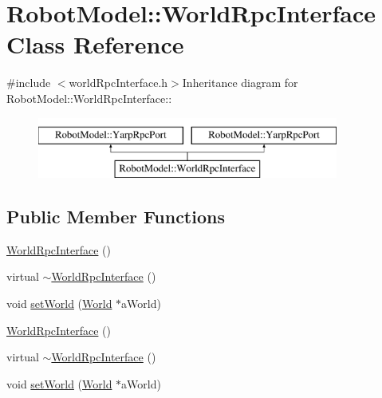 \hypertarget{class_robot_model_1_1_world_rpc_interface}{
\section{RobotModel::WorldRpcInterface Class Reference}
\label{class_robot_model_1_1_world_rpc_interface}
}


{\ttfamily \#include $<$worldRpcInterface.h$>$}Inheritance diagram for RobotModel::WorldRpcInterface::\begin{figure}[H]
\begin{center}
\leavevmode
\includegraphics[height=2cm]{class_robot_model_1_1_world_rpc_interface}
\end{center}
\end{figure}
\subsection*{Public Member Functions}
\begin{DoxyCompactItemize}
\item 
\hyperlink{class_robot_model_1_1_world_rpc_interface_a214bbac16ce3a3a94aa1bd600090ae2b}{WorldRpcInterface} ()
\item 
virtual \hyperlink{class_robot_model_1_1_world_rpc_interface_a6b990fdbe2cb39fc2d0e2ef9e8139250}{$\sim$WorldRpcInterface} ()
\item 
void \hyperlink{class_robot_model_1_1_world_rpc_interface_ae5a8361ea49e3bfb4218d7bcfd791587}{setWorld} (\hyperlink{class_robot_model_1_1_world}{World} $\ast$aWorld)
\item 
\hyperlink{class_robot_model_1_1_world_rpc_interface_add2e2ea1752a66bb36ffadc299fd7145}{WorldRpcInterface} ()
\item 
virtual \hyperlink{class_robot_model_1_1_world_rpc_interface_a878372429f03c6b84e747e5a6d9716a5}{$\sim$WorldRpcInterface} ()
\item 
void \hyperlink{class_robot_model_1_1_world_rpc_interface_ae5a8361ea49e3bfb4218d7bcfd791587}{setWorld} (\hyperlink{class_robot_model_1_1_world}{World} $\ast$aWorld)
\end{DoxyCompactItemize}


